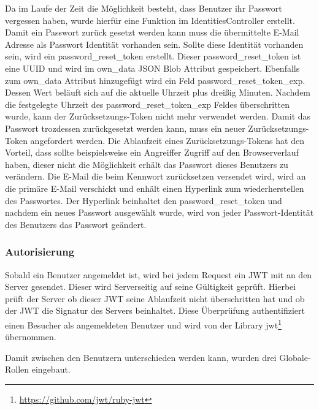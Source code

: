\begin{description}
	Da im Laufe der Zeit die Möglichkeit besteht, dass Benutzer ihr Passwort vergessen haben, wurde hierfür eine Funktion im IdentitiesController erstellt. Damit ein Passwort zurück gesetzt werden kann muss die übermittelte E-Mail Adresse als Passwort Identität vorhanden sein. Sollte diese Identität vorhanden sein, wird ein password\_reset\_token erstellt. Dieser password\_reset\_token ist eine \gls{UUID} und wird im own\_data JSON Blob Attribut gespeichert. Ebenfalls zum own\_data Attribut hinzugefügt wird ein Feld password\_reset\_token\_exp. Dessen Wert beläuft sich auf die aktuelle Uhrzeit plus dreißig Minuten. Nachdem die festgelegte Uhrzeit des password\_reset\_token\_exp Feldes überschritten wurde, kann der Zurücksetzungs-Token nicht mehr verwendet werden. Damit das Passwort trozdessen zurückgesetzt werden kann, muss ein neuer Zurücksetzungs-Token angefordert werden. Die Ablaufzeit eines Zurücksetzungs-Tokens hat den Vorteil, dass sollte beispielsweise ein Angreiffer Zugriff auf den Browserverlauf haben, dieser nicht die Möglichkeit erhält das Passwort dieses Benutzers zu verändern. Die E-Mail die beim Kennwort zurücksetzen versendet wird, wird an die primäre E-Mail verschickt und enhält einen Hyperlink zum wiederherstellen des Passwortes. Der Hyperlink beinhaltet den password\_reset\_token und nachdem ein neues Passwort ausgewählt wurde, wird von jeder Passwort-Identität des Benutzers das Passwort geändert.
\end{description}

\subsubsection{Autorisierung}
\label{sec:server-authorisation}
Sobald ein Benutzer angemeldet ist, wird bei jedem Request ein \gls{JWT} mit an den Server gesendet. Dieser wird Serverseitig auf seine Gültigkeit geprüft. Hierbei prüft der Server ob dieser \gls{JWT} seine Ablaufzeit nicht überschritten hat und ob der \gls{JWT} die Signatur des Servers beinhaltet. Diese Überprüfung authentifiziert einen Besucher als angemeldeten Benutzer und wird von der Library jwt\footnote{\url{https://github.com/jwt/ruby-jwt}} übernommen.

Damit zwischen den Benutzern unterschieden werden kann, wurden drei Globale-Rollen eingebaut.


